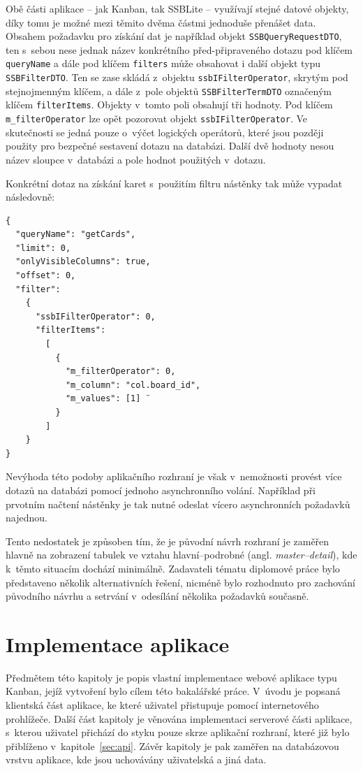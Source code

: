 Obě části aplikace -- jak Kanban, tak SSBLite -- využívají stejné datové objekty, díky tomu je možné mezi těmito dvěma částmi jednoduše přenášet data. Obsahem požadavku pro získání dat je například objekt \texttt{SSBQueryRequestDTO}, ten s~sebou nese jednak název konkrétního před-připraveného dotazu pod klíčem \texttt{queryName} a dále pod klíčem \texttt{filters} může obsahovat i další objekt typu \texttt{SSBFilterDTO}. Ten se zase skládá z~objektu \texttt{ssbIFilterOperator}, skrytým pod stejnojmenným klíčem, a dále z~pole objektů \texttt{SSBFilterTermDTO} označeným klíčem \texttt{filterItems}. Objekty v~tomto poli obsahují tři hodnoty. Pod klíčem \texttt{m\_filterOperator} lze opět pozorovat objekt \texttt{ssbIFilterOperator}. Ve skutečnosti se jedná pouze o~výčet logických operátorů, které jsou později použity pro bezpečné sestavení dotazu na databázi. Další dvě hodnoty nesou název sloupce v~databázi a pole hodnot použitých v~dotazu.

Konkrétní dotaz na získání karet s~použitím filtru nástěnky tak může vypadat následovně:

\begin{verbatim}
{
  "queryName": "getCards",
  "limit": 0,
  "onlyVisibleColumns": true,
  "offset": 0,
  "filter":
    {
      "ssbIFilterOperator": 0,
      "filterItems":
        [
          {
            "m_filterOperator": 0,
            "m_column": "col.board_id",
            "m_values": [1] ¨
          }
        ]
    }
}
\end{verbatim}

Nevýhoda této podoby aplikačního rozhraní je však v~nemožnosti provést více dotazů na databázi pomocí jednoho asynchronního volání. Například při prvotním načtení nástěnky je tak nutné odeslat vícero asynchronních požadavků najednou.

Tento nedostatek je způsoben tím, že je původní návrh rozhraní je zaměřen hlavně na zobrazení tabulek ve vztahu hlavní--podrobné (angl. \emph{master--detail}), kde k~těmto situacím dochází minimálně. Zadavateli tématu diplomové práce bylo představeno několik alternativních řešení, nicméně bylo rozhodnuto pro zachování původního návrhu a setrvání v~odesílání několika požadavků současně. 

\chapter{Implementace aplikace}
Předmětem této kapitoly je popis vlastní implementace webové aplikace typu Kanban, jejíž vytvoření bylo cílem této bakalářské práce. V~úvodu je popsaná klientská část aplikace, ke které uživatel přistupuje pomocí internetového prohlížeče. Další část kapitoly je věnována implementaci serverové části aplikace, s~kterou uživatel přichází do styku pouze skrze aplikační rozhraní, které již bylo přiblíženo v~kapitole~\ref{sec:api}. Závěr kapitoly je pak zaměřen na databázovou vrstvu aplikace, kde jsou uchovávány uživatelská a jiná data.



